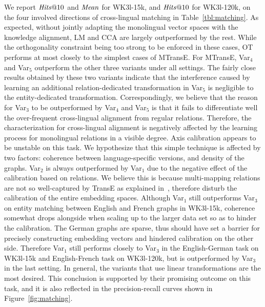 \documentclass{article}
\begin{document}
 We report $\mathit{Hits}\mbox{@}10$ and $\mathit{Mean}$ for WK3l-15k, and $\mathit{Hits}\mbox{@}10$ for WK3l-120k, on the four involved directions of cross-lingual matching in Table~\ref{tbl:matching}. As expected, without jointly adapting the monolingual vector spaces with the knowledge alignment, LM and CCA are largely outperformed by the rest. While the orthogonality constraint being too strong to be enforced in these cases, OT performs at most closely to the simplest cases of MTransE. For MTransE, Var$_4$ and Var$_5$ outperform the other three variants under all settings. The fairly close results obtained by these two variants indicate that the interference caused by learning an additional relation-dedicated transformation in Var$_5$ is negligible to the entity-dedicated transformation. Correspondingly, we believe that the reason for Var$_3$ to be outperformed by Var$_4$ and Var$_5$ is that it fails to differentiate well the over-frequent cross-lingual alignment from regular relations. Therefore, the characterization for cross-lingual alignment is negatively affected by the learning process for monolingual relations in a visible degree. Axis calibration appears to be unstable on this task. We hypothesize that this simple technique is affected by two factors: coherence between language-specific versions, and density of the graphs. Var$_2$ is always outperformed by Var$_1$ due to the negative effect of the calibration based on relations. We believe this is because multi-mapping relations are not so well-captured by TransE as explained in~\cite{wang2014knowledge}, therefore disturb the calibration of the entire embedding \mbox{spaces}. Although Var$_1$ still outperforms Var$_3$ on entity matching between English and French graphs in WK3l-15k, coherence somewhat drops alongside when scaling up to the larger data set so as to hinder the calibration. The German graphs are \mbox{sparse}, thus should have set a barrier for precisely constructing embedding vectors and hindered calibration on the other side. Therefore Var$_1$ still performs closely to Var$_3$ in the English-German task on WK3l-15k and English-French task on WK3l-120k, but is outperformed by Var$_3$ in the last setting. In general, the variants that use linear transformations are the most desired. This conclusion is supported
by their promising outcome on this task, and it is also reflected in the precision-recall curves shown in Figure~\ref{fig:matching}.
\end{document}

